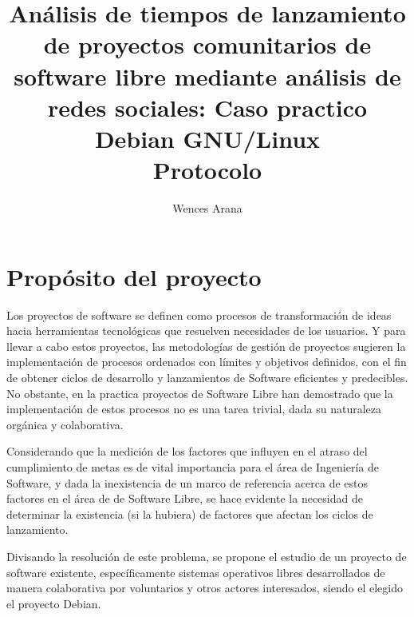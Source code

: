 \documentclass[12pt]{report}
\begin{document}
  \title{ {Análisis  de  tiempos  de  lanzamiento  de
proyectos comunitarios  de software  libre mediante análisis  de redes
sociales:   Caso   practico    Debian   GNU/Linux}
\\   {Protocolo}   }
\author{Wences Arana}
\maketitle

\tableofcontents


\chapter*{Propósito del proyecto}

Los proyectos de  software se definen como  procesos de transformación
de ideas hacia herramientas  tecnológicas que resuelven necesidades de
los usuarios. Y  para llevar a cabo estos  proyectos, las metodologías
de  gestión  de  proyectos  sugieren  la  implementación  de  procesos
ordenados con  límites y  objetivos definidos, con  el fin  de obtener
ciclos  de   desarrollo  y  lanzamientos  de   Software  eficientes  y
predecibles.  No obstante, en la  practica proyectos de Software Libre
han demostrado que la implementación de estos procesos no es una tarea
trivial, dada su naturaleza orgánica y colaborativa.

Considerando que la medición de los factores que influyen en el atraso
del cumplimiento  de metas  es de  vital importancia  para el  área de
Ingeniería  de  Software,  y  dada  la inexistencia  de  un  marco  de
referencia acerca de  estos factores en el área de  de Software Libre,
se  hace evidente  la necesidad  de  determinar la  existencia (si  la
hubiera) de factores que afectan los ciclos de lanzamiento.


Divisando la resolución de este problema,  se propone el estudio de un
proyecto  de software  existente, específicamente  sistemas operativos
libres desarrollados  de manera  colaborativa por voluntarios  y otros
actores interesados, siendo el elegido el proyecto Debian.
\end{document}
